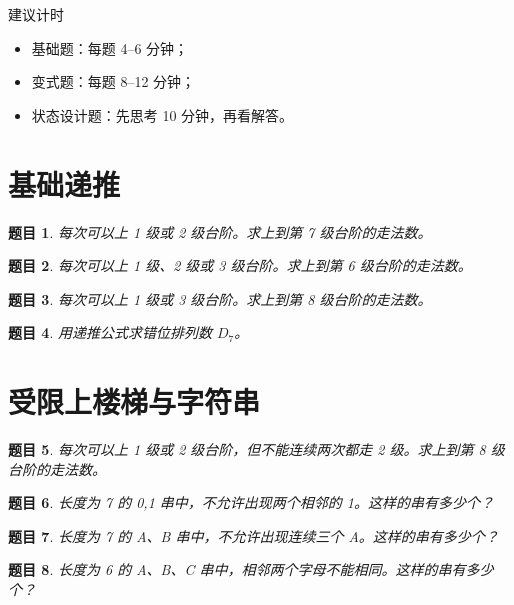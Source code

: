 \documentclass[11pt,a4paper,fontset=fandol]{ctexart}
\theoremstyle{formalexample}
\newtheorem{exercise}{题目}[section]
\begin{document}
\begin{notebox}{建议计时}
\begin{itemize}
  \item 基础题：每题 4--6 分钟；
  \item 变式题：每题 8--12 分钟；
  \item 状态设计题：先思考 10 分钟，再看解答。
\end{itemize}
\end{notebox}

\section{基础递推}

\begin{exercise}
每次可以上 1 级或 2 级台阶。求上到第 7 级台阶的走法数。
\end{exercise}

\begin{exercise}
每次可以上 1 级、2 级或 3 级台阶。求上到第 6 级台阶的走法数。
\end{exercise}

\begin{exercise}
每次可以上 1 级或 3 级台阶。求上到第 8 级台阶的走法数。
\end{exercise}

\begin{exercise}
用递推公式求错位排列数 $D_7$。
\end{exercise}

\section{受限上楼梯与字符串}

\begin{exercise}
每次可以上 1 级或 2 级台阶，但不能连续两次都走 2 级。求上到第 8 级台阶的走法数。
\end{exercise}

\begin{exercise}
长度为 7 的 0,1 串中，不允许出现两个相邻的 1。这样的串有多少个？
\end{exercise}

\begin{exercise}
长度为 7 的 A、B 串中，不允许出现连续三个 A。这样的串有多少个？
\end{exercise}

\begin{exercise}
长度为 6 的 A、B、C 串中，相邻两个字母不能相同。这样的串有多少个？
\end{exercise}
\end{document}
